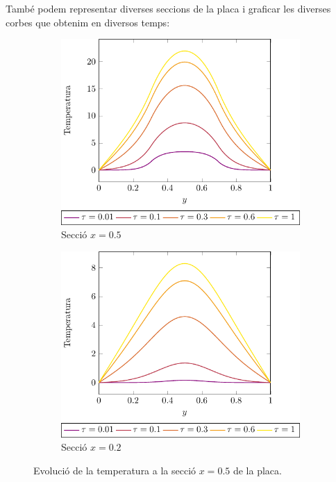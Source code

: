 \documentclass[10pt,a4paper]{article}
\theoremstyle{definition}
\theoremstyle{remark}
\begin{document}
També podem representar diverses seccions de la placa i graficar les diverses corbes que obtenim en diversos temps:

\begin{figure}[t!]
  \centering
  \begin{subfigure}{0.49\linewidth}
    \centering
    \includegraphics[width=\linewidth]{Images/graphic50.pdf}
    \caption{Secció $x=0.5$}
  \end{subfigure}\hfill
  \begin{subfigure}{0.49\linewidth}
    \centering
    \includegraphics[width=\linewidth]{Images/graphic20.pdf}
    \caption{Secció $x=0.2$}
  \end{subfigure}
  \caption{Evolució de la temperatura a la secció $x=0.5$ de la placa.}
\end{figure}
\end{document}
